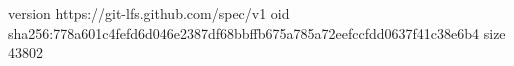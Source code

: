 version https://git-lfs.github.com/spec/v1
oid sha256:778a601c4fefd6d046e2387df68bbffb675a785a72eefccfdd0637f41c38e6b4
size 43802
